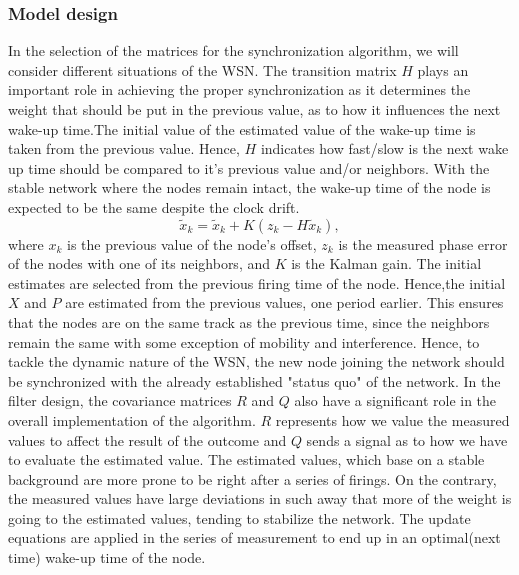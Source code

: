 \documentclass[a4paper,10pt]{report}
\begin{document}
\subsubsection{Model design}
In the selection of the matrices for the synchronization algorithm, we will consider different situations of the WSN.
\newline
The transition matrix $H$ plays an important role in achieving the proper synchronization as it determines the weight that should
be put in the previous value, as to how it influences the next wake-up time.The initial value of the estimated value of the wake-up time is taken from the previous value. Hence, $H$ indicates how fast/slow is the next wake up time should be compared to it's previous value and/or neighbors. With the stable network where the nodes remain intact, the wake-up time of the node is expected to be the same despite the clock drift.
\begin{equation}
\tilde x_k = \tilde x_k + K(z_k-H\tilde x_k) \label{diff},
\end{equation}
where $x_k$ is the previous value of the node's offset, $z_k$ is the measured phase error of the nodes with one of its neighbors, and $K$ is the Kalman gain. \newline
The initial estimates are selected from the previous firing time of the node. Hence,the initial $X$ and $P$ are estimated from the previous values, one period earlier. This ensures that the nodes are on the same track as the previous time, since the neighbors remain the same with some exception of mobility and interference. \newline
Hence, to tackle the dynamic nature of the WSN, the new node joining the network should be synchronized with the already established "status quo" of the network. In the filter design, the covariance matrices $R$ and $Q$ also have a significant role in the overall implementation of the algorithm. $R$ represents how we value the measured values to affect the result of the outcome and $Q$ sends a signal as to how we have to evaluate the estimated value. \newline The estimated values, which base on a stable background are more prone to be right after a series of firings. On the contrary, the measured values have large deviations in such away that more of the weight is going to the estimated values, tending to stabilize the network. \newline The update equations are applied in the series of measurement
to end up in an optimal(next time) wake-up time of the node.
\end{document}
